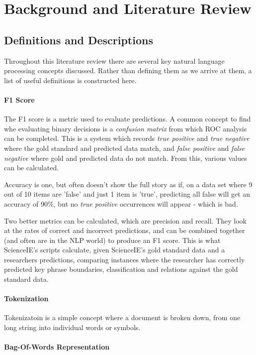 \chapter{Background and Literature Review}

\section{Definitions and Descriptions}
Throughout this literature review there are several key natural language processing concepts discussed. Rather than defining them as we arrive at them, a list of useful definitions is constructed here.

\subsubsection*{F1 Score}
The F1 score is a metric used to evaluate predictions. A common concept to find whe evaluating binary decisions is a \textit{confusion matrix} from which ROC analysis can be completed\cite{Fawcett2006}. This is a system which records \textit{true positive} and \textit{true negative} where the gold standard and predicted data match, and \textit{false positive} and \textit{false negative} where gold and predicted data do not match. From this, various values can be calculated. 

Accuracy is one, but often doesn't show the full story as if, on a data set where 9 out of 10 items are 'false' and just 1 item is 'true', predicting all false will get an accuracy of 90\%, but no \textit{true positive} occurrences will appear - which is bad. 

Two better metrics can be calculated, which are precision and recall. They look at the rates of correct and incorrect predictions, and can be combined together (and often are in the NLP world) to produce an F1 score. This is what ScienceIE's scripts calculate, given ScienceIE's gold standard data and a researchers predictions, comparing instances where the researcher has correctly predicted key phrase boundaries, classification and relations against the gold standard data.

\subsubsection*{Tokenization}
Tokenizatoin is a simple concept where a document is broken down, from one long string into individual words or symbols. 

\subsubsection*{Bag-Of-Words Representation}


